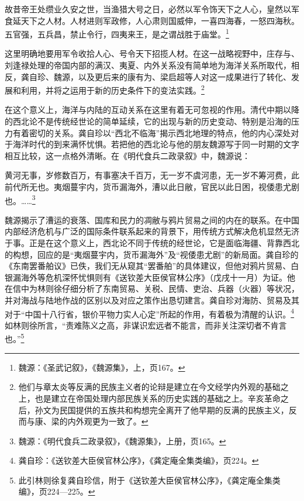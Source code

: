 \documentclass[a4paper, 12pt, openright]{ctexbook}
\renewenvironment{quote}
  {\list{}{\rightmargin2\ccwd \leftmargin2\ccwd \itemindent=2\ccwd \listparindent=2\ccwd}%
   \item\relax\small\kaishu\color{black}}
  {\endlist}
\begin{document}
\begin{quote}
故昔帝王处缵业久安之世，当渔猎大号之日，必然以军令饰天下之人心，皇然以军食延天下之人材。人材进则军政修，人心肃则国威伸，一喜四海春，一怒四海秋。五官强，五兵昌，禁止令行，四夷来王，是之谓战胜于庙堂。\footnote{魏源：《圣武记叙》，《魏源集》，上，页167。}
\end{quote}

这里明确地要用军令收拾人心、号令天下招揽人材。在这一战略视野中，庄存与、刘逢禄处理的帝国内部的满汉、夷夏、内外关系没有简单地为海洋关系所取代，相反，龚自珍、魏源，以及更后来的康有为、梁启超等人对这一成果进行了转化、发展和利用，并将之运用于新的历史条件下的变法实践。\footnote{他们与章太炎等反满的民族主义者的论辩是建立在今文经学内外观的基础之上，也是建立在帝国处理内部民族关系的历史实践的基础之上。辛亥革命之后，孙文为民国提供的五族共和构想完全离开了他早期的反满的民族主义，反而与康、梁的内外观更为一致了。}

在这个意义上，海洋与内陆的互动关系在这里有着无可忽视的作用。清代中期以降的西北论不是传统经世论的简单延续，它的出现与新的历史变动、特别是沿海的压力有着密切的关系。龚自珍以“西北不临海”揭示西北地理的特点，他的内心深处对于海洋时代的到来满怀忧惧。若把他的西北论与他的朋友魏源写于同一时期的文字相互比较，这一点格外清晰。在《明代食兵二政录叙》中，魏源说：

\begin{quote}
黄河无事，岁修数百万，有事塞决千百万，无一岁不虞河患，无一岁不筹河费，此前代所无也。夷烟蔓宇内，货币漏海外，漕以此日敝，官民以此日困，视倭患尤剧也。……\footnote{魏源：《明代食兵二政录叙》，《魏源集》，上册，页165。}
\end{quote}

魏源揭示了漕运的衰落、国库和民力的凋敝与鸦片贸易之间的内在的联系。在中国内部经济危机与广泛的国际条件联系起来的背景下，用传统方式解决危机显然无济于事。正是在这个意义上，西北论不同于传统的经世论，它是面临海疆、背靠西北的构想，回应的是“夷烟蔓宇内，货币漏海外”及“视倭患尤剧”的新局面。龚自珍的《东南罢番舶议》已佚，我们无从窥其“罢番舶”的具体建议，但他对鸦片贸易、白银漏海外等危机深怀忧惧则有《送钦差大臣侯官林公序》（戊戌十一月）为证。他在信中为林则徐仔细分析了东南贸易、关税、民情、吏治、兵器（火器）等状况，并对海战与陆地作战的区别以及对应之策作出恳切建言。龚自珍对海防、贸易及其对于“中国十八行省，银价平物力实人心定”所起的作用，有着极为清醒的认识。\footnote{龚自珍：《送钦差大臣侯官林公序》，《龚定庵全集类编》，页224。}如林则徐所言，“责难陈义之高，非谋识宏远者不能言，而非关注深切者不肯言也。”\footnote{此引林则徐复龚自珍信，附于《送钦差大臣侯官林公序》，《龚定庵全集类编》，页224—225。}
\end{document}

